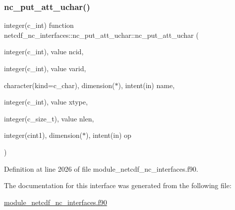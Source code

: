 \subsubsection{\texorpdfstring{nc\+\_\+put\+\_\+att\+\_\+uchar()}{nc\_put\_att\_uchar()}}
{\footnotesize\ttfamily integer(c\+\_\+int) function netcdf\+\_\+nc\+\_\+interfaces\+::nc\+\_\+put\+\_\+att\+\_\+uchar\+::nc\+\_\+put\+\_\+att\+\_\+uchar (\begin{DoxyParamCaption}\item[{integer(c\+\_\+int), value}]{ncid,  }\item[{integer(c\+\_\+int), value}]{varid,  }\item[{character(kind=c\+\_\+char), dimension($\ast$), intent(in)}]{name,  }\item[{integer(c\+\_\+int), value}]{xtype,  }\item[{integer(c\+\_\+size\+\_\+t), value}]{nlen,  }\item[{integer(cint1), dimension($\ast$), intent(in)}]{op }\end{DoxyParamCaption})}



Definition at line 2026 of file module\+\_\+netcdf\+\_\+nc\+\_\+interfaces.\+f90.



The documentation for this interface was generated from the following file\+:\begin{DoxyCompactItemize}
\item 
\hyperlink{module__netcdf__nc__interfaces_8f90}{module\+\_\+netcdf\+\_\+nc\+\_\+interfaces.\+f90}\end{DoxyCompactItemize}
